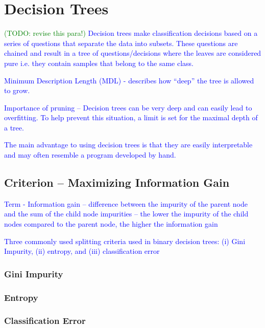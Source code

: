\section{Decision Trees}

\textcolor{blue}{\textcolor{green}{(TODO: revise this para!)} Decision trees make classification decisions based on a series of questions that separate the data into subsets. These questions are chained and result in a tree of questions/decisions where the leaves are considered pure i.e. they contain samples that belong to the same class.}

\textcolor{blue}{Minimum Description Length (MDL) - describes how ``deep'' the tree is allowed to grow.}

\textcolor{blue}{Importance of pruning -- Decision trees can be very deep and can easily lead to overfitting. To help prevent this situation, a limit is set for the maximal depth of a tree. }

\textcolor{blue}{The main advantage to using decision trees is that they are easily interpretable and may often resemble a program developed by hand.}

\subsection{Criterion -- Maximizing Information Gain}

\textcolor{blue}{Term - Information gain -- difference between the impurity of the parent node and the sum of the child node impurities -- the lower the impurity of the child nodes compared to the parent node, the higher the information gain}

\textcolor{blue}{Three commonly used splitting criteria used in binary decision trees: (i) Gini Impurity, (ii) entropy, and (iii) classification error}

\subsubsection{Gini Impurity}

\subsubsection{Entropy}

\subsubsection{Classification Error}


